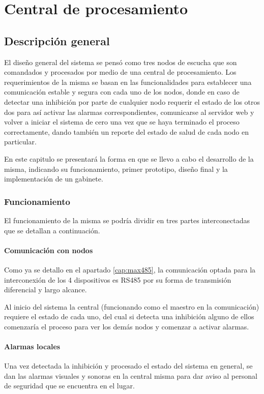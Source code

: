 \chapter{Central de procesamiento}
\section{Descripción general}
\par El diseño general del sistema se pensó como tres nodos de escucha que son comandados y
procesados por medio de una central de procesamiento. Los requerimientos de la misma se
basan en las funcionalidades para establecer una comunicación estable y segura con cada uno
de los nodos, donde en caso de detectar una inhibición por parte de cualquier nodo requerir
el estado de los otros dos para así activar las alarmas correspondientes, comunicarse al
servidor web y volver a iniciar el sistema de cero una vez que se haya terminado el proceso
correctamente, dando también un reporte del estado de salud de cada nodo en particular.
\par En este capitulo se presentará la forma en que se llevo a cabo el desarrollo de la
misma, indicando su funcionamiento, primer prototipo, diseño final y la implementación de
un gabinete. 
\subsection{Funcionamiento}
\par El funcionamiento de la misma se podría dividir en tres partes interconectadas que se detallan a continuación.
\subsubsection{Comunicación con nodos}

\par Como ya se detallo en el apartado \ref{cap:max485}, la comunicación optada para la interconexión de los 4 dispositivos es RS485 por su forma de transmisión diferencial y largo alcance. 
\par Al inicio del sistema la central (funcionando como el maestro en la comunicación) requiere el estado de cada uno, del cual si detecta una inhibición alguno de ellos comenzaría el proceso para ver los demás nodos y comenzar a activar alarmas.

\subsubsection{Alarmas locales}
\par Una vez detectada la inhibición y procesado el estado del sistema en general, se dan las alarmas visuales y sonoras en la central misma para dar aviso al personal de seguridad que se encuentra en el lugar. 

